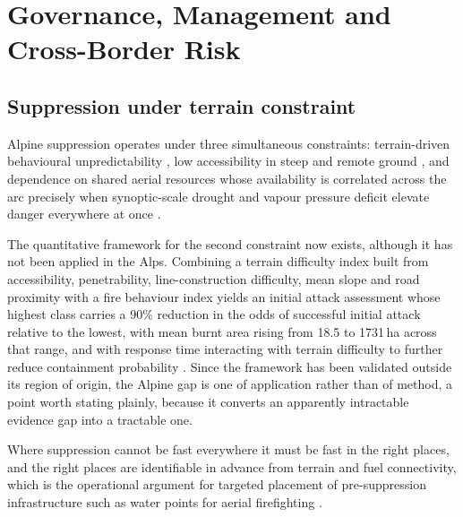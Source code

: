 \documentclass[11pt,a4paper]{article}
\begin{document}
\section{Governance, Management and Cross-Border Risk}
\label{sec:governance}

\subsection{Suppression under terrain constraint}

Alpine suppression operates under three simultaneous constraints: terrain-driven behavioural unpredictability \citep{sharples_overview_2009, melzner_brief_2019}, low accessibility in steep and remote ground \citep{muller_forest_2020}, and dependence on shared aerial resources whose availability is correlated across the arc precisely when synoptic-scale drought and vapour pressure deficit elevate danger everywhere at once \citep{miller_compounding_2025}.

The quantitative framework for the second constraint now exists, although it has not been applied in the Alps. Combining a terrain difficulty index built from accessibility, penetrability, line-construction difficulty, mean slope and road proximity with a fire behaviour index yields an initial attack assessment whose highest class carries a 90\% reduction in the odds of successful initial attack relative to the lowest, with mean burnt area rising from 18.5 to 1731\,ha across that range, and with response time interacting with terrain difficulty to further reduce containment probability \citep{cardil_assessing_2025}. Since the framework has been validated outside its region of origin, the Alpine gap is one of application rather than of method, a point worth stating plainly, because it converts an apparently intractable evidence gap into a tractable one.

Where suppression cannot be fast everywhere it must be fast in the right places, and the right places are identifiable in advance from terrain and fuel connectivity, which is the operational argument for targeted placement of pre-suppression infrastructure such as water points for aerial firefighting \citep{conedera_linking_2024}.
\end{document}
